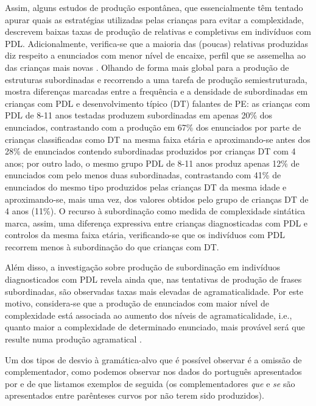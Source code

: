 \documentclass[output=paper,colorlinks,citecolor=brown,booklanguage=portuguese]{langscibook}
\begin{document}
Assim, alguns estudos de produção espontânea, que essencialmente têm tentado apurar quais as estratégias utilizadas pelas crianças para evitar a complexidade, descrevem baixas taxas de produção de relativas e completivas em indivíduos com PDL. Adicionalmente, verifica-se que a maioria das (poucas) relativas produzidas diz respeito a enunciados com menor nível de encaixe, perfil que se assemelha ao das crianças mais novas \citep{Delage2008}. Olhando de forma mais global para a produção de estruturas subordinadas e recorrendo a uma tarefa de produção semiestruturada, \citet{Martinsempreparacao} mostra diferenças marcadas entre a frequência e a densidade de subordinadas em crianças com PDL e desenvolvimento típico (DT) falantes de PE: as crianças com PDL de 8-11 anos testadas produzem subordinadas em apenas 20\% dos enunciados, contrastando com a produção em 67\% dos enunciados por parte de crianças classificadas como DT na mesma faixa etária e aproximando-se antes dos 28\% de enunciados contendo subordinadas produzidos por crianças DT com 4 anos; por outro lado, o mesmo grupo PDL de 8-11 anos produz apenas 12\% de enunciados com pelo menos duas subordinadas, contrastando com 41\% de enunciados do mesmo tipo produzidos pelas crianças DT da mesma idade e aproximando-se, mais uma vez, dos valores obtidos pelo grupo de crianças DT de 4 anos (11\%). O recurso à subordinação como medida de complexidade sintática marca, assim, uma diferença expressiva entre crianças diagnosticadas com PDL e controlos da mesma faixa etária, verificando-se que os indivíduos com PDL recorrem menos à subordinação do que crianças com DT. 

Além disso, a investigação sobre produção de subordinação em indivíduos diagnosticados com PDL revela ainda que, nas tentativas de produção de frases subordinadas, são observadas taxas mais elevadas de agramaticalidade. Por este motivo, considera-se que a produção de enunciados com maior nível de complexidade está associada ao aumento dos níveis de agramaticalidade, i.e., quanto maior a complexidade de determinado enunciado, mais provável será que resulte numa produção agramatical \citep{Hamann2007}.

Um dos tipos de desvio à gramática-alvo que é possível observar é a omissão de complementador, como podemos observar nos dados do português apresentados por \citet[79]{SuaKay19971998} e de que listamos exemplos de seguida (os complementadores \emph{que} e \emph{se} são apresentados entre parênteses curvos por não terem sido produzidos). 
\end{document}
